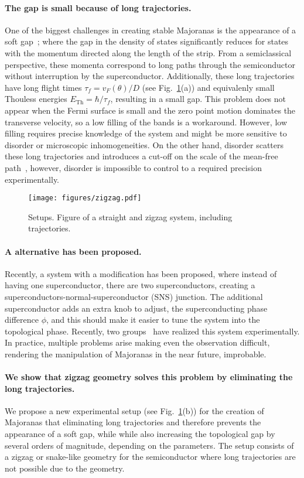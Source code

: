 \documentclass[english, twocolumn, 10pt, aps, superscriptaddress, floatfix, prb, citeautoscript]{revtex4-1}
\renewcommand{\comment}[2]{#2}
\renewcommand{\comment}{\paragraph}
\begin{document}
\comment{The gap is small because of long trajectories.}
One of the biggest challenges in creating stable Majoranas is the appearance of a soft gap~\cite{ren_topological_2018}; where the gap in the density of states significantly reduces for states with the momentum directed along the length of the strip.
From a semiclassical perspective, these momenta correspond to long paths through the semiconductor without interruption by the superconductor.
Additionally, these long trajectories have long flight times $\tau_f=v_F(\theta) / D$ (see Fig.~\ref{fig:setup}(a)) and equivalenly small Thouless energies $E_{\textrm{Th}}=\hbar / \tau_f$, resulting in a small gap. %
This problem does not appear when the Fermi surface is small and the zero point motion dominates the transverse velocity, so a low filling of the bands is a workaround\cite{nijholt2015orbital}.
However, low filling requires precise knowledge of the system and might be more sensitive to disorder or microscopic inhomogeneities.
On the other hand, disorder scatters these long trajectories and introduces a cut-off on the scale of the mean-free path~\cite{haim_double-edge_2018}, however, disorder is impossible to control to a required precision experimentally.

\begin{figure}[!htb]
\texttt{[image: figures/zigzag.pdf]}
\caption{Setups. Figure of a straight and zigzag system, including trajectories.
\label{fig:setup}}
\end{figure}

\comment{A alternative has been proposed.}
Recently, a system with a modification has been proposed\cite{pientka2017topological}, where instead of having one superconductor, there are two superconductors, creating a superconductors-normal-superconductor (SNS) junction.
The additional superconductor adds an extra knob to adjust, the superconducting phase difference $\phi$, and this should make it easier to tune the system into the topological phase.
Recently, two groups~\cite{fornieri_evidence_2018,ren_topological_2018} have realized this system experimentally.
In practice, multiple problems arise making even the observation difficult, rendering the manipulation of Majoranas in the near future, improbable.

\comment{We show that zigzag geometry solves this problem by eliminating the long trajectories.}
We propose a new experimental setup (see Fig.~\ref{fig:setup}(b)) for the creation of Majoranas that eliminating long trajectories and therefore prevents the appearance of a soft gap, while while also increasing the topological gap by several orders of magnitude, depending on the parameters.
The setup consists of a zigzag or snake-like geometry for the semiconductor where long trajectories are not possible due to the geometry.
\end{document}
